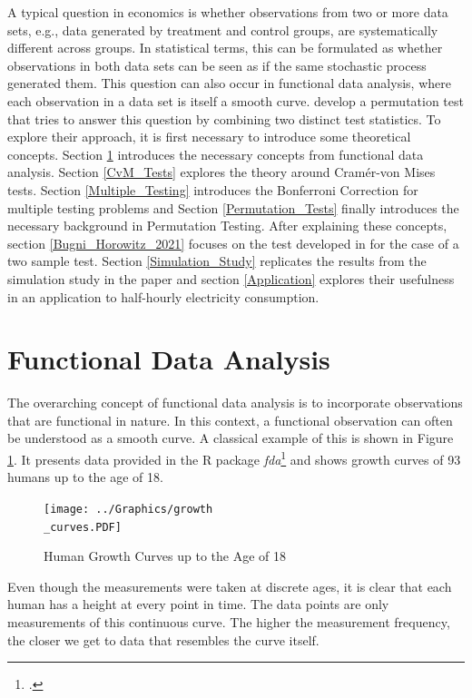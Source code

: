\documentclass[12pt, a4paper]{article}
\theoremstyle{MAstyle} \newtheorem{assumption}{Assumption}[section]
\theoremstyle{MAstyle} \newtheorem{definition}{Definition}[section]
\begin{document}
		A typical question in economics is whether observations from two or more data sets, e.g., data generated by treatment and control groups, are systematically different across groups. In statistical terms, this can be formulated as whether observations in both data sets can be seen as if the same stochastic process generated them.		
		This question can also occur in functional data analysis, where each observation in a data set is itself a smooth curve. \cite{bugni_permutation_2021} develop a permutation test that tries to answer this question by combining two distinct test statistics. To explore their approach, it is first necessary to introduce some theoretical concepts.
		Section \ref{FDA} introduces the necessary concepts from functional data analysis. Section \ref{CvM_Tests} explores the theory around Cram\'{e}r-von Mises tests. Section \ref{Multiple_Testing} introduces the Bonferroni Correction for multiple testing problems and Section \ref{Permutation_Tests} finally introduces the necessary background in Permutation Testing.
		After explaining these concepts, section \ref{Bugni_Horowitz_2021} focuses on the test developed in \cite{bugni_permutation_2021} for the case of a two sample test. Section \ref{Simulation_Study} replicates the results from the simulation study in the paper and section \ref{Application} explores their usefulness in an application to half-hourly electricity consumption.
	
	\section{Functional Data Analysis}\label{FDA}
		The overarching concept of functional data analysis is to incorporate observations that are functional in nature. In this context, a functional observation can often be understood as a smooth curve. A classical example of this is shown in Figure \ref{growth_curves}. It presents data provided in the R package \textit{fda}\footcite{fda} and shows growth curves of 93 humans up to the age of 18.
		\begin{figure}[H]
			\texttt{[image: ../Graphics/growth\\\_curves.PDF]}
			\caption{Human Growth Curves up to the Age of 18}
			\label{growth_curves}
		\end{figure}
		Even though the measurements were taken at discrete ages, it is clear that each human has a height at every point in time. The data points are only measurements of this continuous curve. The higher the measurement frequency, the closer we get to data that resembles the curve itself.
		
\end{document}
